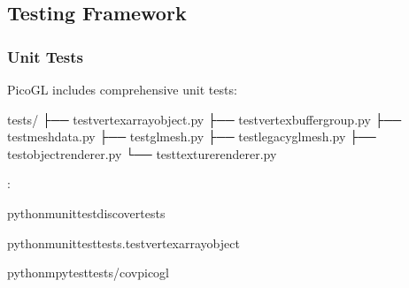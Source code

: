 \documentclass[a4paper,10pt,english,openany,oneside]{sphinxmanual}
\begin{document}
\begin{sphinxVerbatim}[commandchars=\\\{\}]
     
         
     
         
         
\end{sphinxVerbatim}


\subsection{Testing Framework}
\label{\detokenize{development:testing-framework}}

\subsubsection{Unit Tests}
\label{\detokenize{development:unit-tests}}
\sphinxAtStartPar
PicoGL includes comprehensive unit tests:

\sphinxAtStartPar
{}

\begin{sphinxVerbatim}[commandchars=\\\{\}]
tests/
├── test\PYGZus{}vertex\PYGZus{}array\PYGZus{}object.py
├── test\PYGZus{}vertex\PYGZus{}buffer\PYGZus{}group.py
├── test\PYGZus{}meshdata.py
├── test\PYGZus{}glmesh.py
├── test\PYGZus{}legacy\PYGZus{}glmesh.py
├── test\PYGZus{}object\PYGZus{}renderer.py
└── test\PYGZus{}texture\PYGZus{}renderer.py
\end{sphinxVerbatim}

\sphinxAtStartPar
{}:

\begin{sphinxVerbatim}[commandchars=\\\{\}]
python\PYGZhy{}munittestdiscovertests

python\PYGZhy{}munittesttests.test\PYGZus{}vertex\PYGZus{}array\PYGZus{}object

python\PYGZhy{}mpytesttests/\PYGZhy{}\PYGZhy{}covpicogl
\end{sphinxVerbatim}
\end{document}
